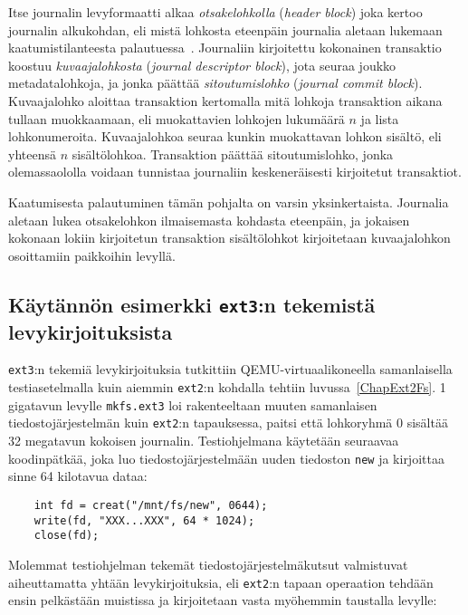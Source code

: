 Itse journalin levyformaatti alkaa \emph{otsakelohkolla} (\emph{header block}) joka kertoo journalin alkukohdan,
eli mistä lohkosta eteenpäin journalia aletaan lukemaan kaatumistilanteesta palautuessa~\cite{JournalingAnalysis}.
Journaliin kirjoitettu kokonainen transaktio koostuu \emph{kuvaajalohkosta} (\emph{journal descriptor block}),
jota seuraa joukko metadatalohkoja,
ja jonka päättää \emph{sitoutumislohko} (\emph{journal commit block}).
Kuvaajalohko aloittaa transaktion kertomalla mitä lohkoja transaktion aikana tullaan muokkaamaan,
eli muokattavien lohkojen lukumäärä $n$ ja lista lohkonumeroita.
Kuvaajalohkoa seuraa kunkin muokattavan lohkon sisältö, eli yhteensä $n$ sisältölohkoa.
Transaktion päättää sitoutumislohko,
jonka olemassaololla voidaan tunnistaa journaliin keskeneräisesti kirjoitetut transaktiot.

Kaatumisesta palautuminen tämän pohjalta on varsin yksinkertaista.
Journalia aletaan lukea otsakelohkon ilmaisemasta kohdasta eteenpäin,
ja jokaisen kokonaan lokiin kirjoitetun transaktion sisältölohkot kirjoitetaan kuvaajalohkon osoittamiin paikkoihin levyllä.

\subsection{Käytännön esimerkki \texttt{ext3}:n tekemistä levykirjoituksista}
\texttt{ext3}:n tekemiä levykirjoituksia tutkittiin QEMU-virtuaalikoneella samanlaisella testiasetelmalla kuin aiemmin \texttt{ext2}:n kohdalla tehtiin luvussa~\ref{ChapExt2Fs}.
1 gigatavun levylle \texttt{mkfs.ext3} loi rakenteeltaan muuten samanlaisen tiedostojärjestelmän kuin \texttt{ext2}:n tapauksessa,
paitsi että lohkoryhmä 0 sisältää 32 megatavun kokoisen journalin.
Testiohjelmana käytetään seuraavaa koodinpätkää,
joka luo tiedostojärjestelmään uuden tiedoston \texttt{new} ja kirjoittaa sinne 64 kilotavua dataa:
%
\begin{verbatim}
    int fd = creat("/mnt/fs/new", 0644);
    write(fd, "XXX...XXX", 64 * 1024);
    close(fd);
\end{verbatim}
%
Molemmat testiohjelman tekemät tiedostojärjestelmäkutsut valmistuvat aiheuttamatta yhtään levykirjoituksia,
eli \texttt{ext2}:n tapaan operaation tehdään ensin pelkästään muistissa ja kirjoitetaan vasta myöhemmin taustalla levylle:

